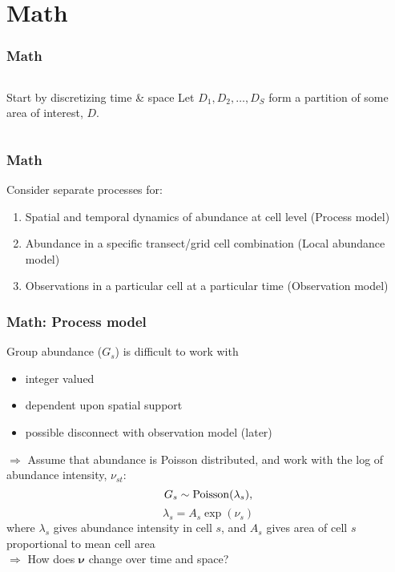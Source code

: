 \documentclass[serif,mathserif]{beamer}
\begin{document}
\section{Math}
\begin{frame}
  \frametitle{Math}
 \begin{columns}[c]
  \column{1.5in}
  \begin{block}{Start by discretizing time \& space}
  Let $D_1, D_2, \hdots, D_S$ form a partition of some area of interest, $D$.
  \end{block}
  \column{2in}
   \end{columns}
\end{frame}

\begin{frame}
  \frametitle{Math}
  Consider separate processes for:
  \begin{enumerate}
  \item Spatial and temporal dynamics of abundance at cell level {\color{noaaturq} (Process model)} \pause
  \item Abundance in a specific transect/grid cell combination {\color{noaaturq} (Local abundance model)} \pause
  \item Observations in a particular cell at a particular time {\color{noaaturq} (Observation model)}
  \end{enumerate}
\end{frame}

\begin{frame}
  \frametitle{Math: Process model}
  Group abundance ($G_s$) is difficult to work with
  \begin{itemize}
    \item integer valued \pause
    \item dependent upon spatial support \pause
    \item possible disconnect with observation model (later) \pause
  \end{itemize}
 {\color{noaaturq} $\Rightarrow$ Assume that abundance is Poisson distributed, and work with the log of abundance intensity, $\nu_{st}$:}
 $$ G_{s} \sim {\rm Poisson}(\lambda_{s}),$$
 $$   \lambda_{s}=A_s \exp(\nu_{s}) $$
 where $\lambda_{s}$ gives abundance intensity in cell $s$, and $A_s$ gives area of cell $s$ proportional to mean cell area  \pause \\
 {\color{noaaturq} $\Rightarrow$ How does $\boldsymbol{\nu}$ change over time and space?}
 \end{frame}
\end{document}
